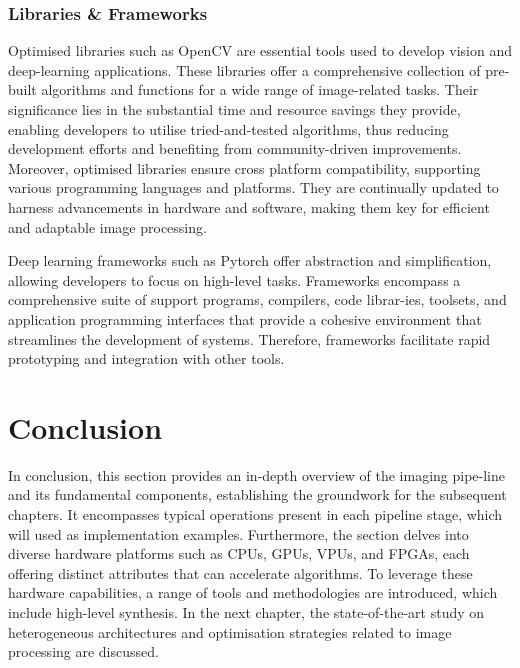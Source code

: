 \subsubsection{Libraries \& Frameworks}
Optimised libraries such as OpenCV\cite{opencv_library} are essential tools used to develop vision and deep-learning applications. These libraries offer a comprehensive collection of pre-built algorithms and functions for a wide range of image-related tasks. Their significance lies in the substantial time and resource savings they provide, enabling developers to utilise tried-and-tested algorithms, thus reducing development efforts and benefiting from community-driven improvements. Moreover, optimised libraries ensure cross platform compatibility, supporting various programming languages and platforms. They are continually updated to harness advancements in hardware and software, making them key for efficient and adaptable image processing.

Deep learning frameworks such as Pytorch\cite{Pytorch} offer abstraction and simplification, allowing developers to focus on high-level tasks. Frameworks encompass a comprehensive suite of support programs, compilers, code librar-ies, toolsets, and application programming interfaces that provide a cohesive environment that streamlines the development of systems. Therefore, frameworks facilitate rapid prototyping and integration with other tools.

\section{Conclusion}
In conclusion, this section provides an in-depth overview of the imaging pipe-line and its fundamental components, establishing the groundwork for the subsequent chapters. It encompasses typical operations present in each pipeline stage, which will used as implementation examples. Furthermore, the section delves into diverse hardware platforms such as CPUs, GPUs, VPUs, and FPGAs, each offering distinct attributes that can accelerate algorithms. To leverage these hardware capabilities, a range of tools and methodologies are introduced, which include high-level synthesis. In the next chapter, the state-of-the-art study on heterogeneous architectures and optimisation strategies related to image processing are discussed.